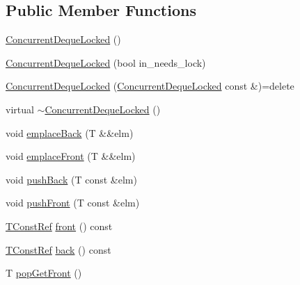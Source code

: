 \subsection*{Public Member Functions}
\begin{DoxyCompactItemize}
\item 
\hyperlink{structvt_1_1util_1_1container_1_1_concurrent_deque_locked_adf6fc93e74d56a37cf1d0692a29e6ef3}{Concurrent\+Deque\+Locked} ()
\item 
\hyperlink{structvt_1_1util_1_1container_1_1_concurrent_deque_locked_a8feaed4765d8775cd39c13df6499b5e8}{Concurrent\+Deque\+Locked} (bool in\+\_\+needs\+\_\+lock)
\item 
\hyperlink{structvt_1_1util_1_1container_1_1_concurrent_deque_locked_ab5d61f2f456b97092cc2164a070c2372}{Concurrent\+Deque\+Locked} (\hyperlink{structvt_1_1util_1_1container_1_1_concurrent_deque_locked}{Concurrent\+Deque\+Locked} const \&)=delete
\item 
virtual \hyperlink{structvt_1_1util_1_1container_1_1_concurrent_deque_locked_a03ce93cd5ef587d5fa6dfd494ece5e73}{$\sim$\+Concurrent\+Deque\+Locked} ()
\item 
void \hyperlink{structvt_1_1util_1_1container_1_1_concurrent_deque_locked_a4d9bbc1980dba1ffdc3ba8f8eb2c52d5}{emplace\+Back} (T \&\&elm)
\item 
void \hyperlink{structvt_1_1util_1_1container_1_1_concurrent_deque_locked_a5f5007fed6eaa4d42d1877a0d8b096c9}{emplace\+Front} (T \&\&elm)
\item 
void \hyperlink{structvt_1_1util_1_1container_1_1_concurrent_deque_locked_aa3c9c04fc999b13a6418c08e7c29f969}{push\+Back} (T const \&elm)
\item 
void \hyperlink{structvt_1_1util_1_1container_1_1_concurrent_deque_locked_a5bfd4d329adde2c68c2c1cbc13f98ff4}{push\+Front} (T const \&elm)
\item 
\hyperlink{structvt_1_1util_1_1container_1_1_concurrent_deque_locked_a9da9776dff836c013a95431f3ab15e35}{T\+Const\+Ref} \hyperlink{structvt_1_1util_1_1container_1_1_concurrent_deque_locked_a57af0c7ac85e7bb3922bb839b666c1e7}{front} () const
\item 
\hyperlink{structvt_1_1util_1_1container_1_1_concurrent_deque_locked_a9da9776dff836c013a95431f3ab15e35}{T\+Const\+Ref} \hyperlink{structvt_1_1util_1_1container_1_1_concurrent_deque_locked_a1722e76798cd9b6629f111814035e29a}{back} () const
\item 
T \hyperlink{structvt_1_1util_1_1container_1_1_concurrent_deque_locked_aab7ffe336cd7392506121f8e3a86c1b2}{pop\+Get\+Front} ()

\end{DoxyCompactItemize}
